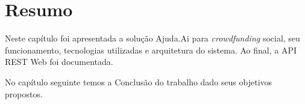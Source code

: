 \pagebreak
\section*{Resumo} \label{sec:ajudaai:resumo}
Neste capítulo foi apresentada a solução Ajuda.Ai para \emph{crowdfunding} social, seu funcionamento, tecnologias utilizadas e arquitetura do sistema. Ao final, a API REST Web foi documentada.

No capítulo seguinte temos a Conclusão do trabalho dado seus objetivos propostos.